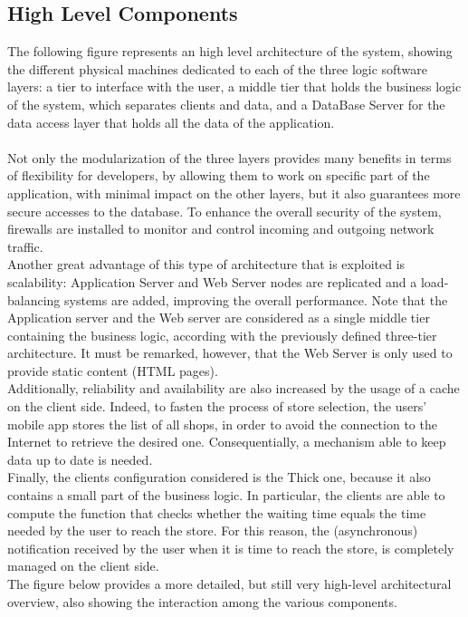 \documentclass{article}
\begin{document}
\subsection{High Level Components}
The following figure represents an high level architecture of the system, showing the different physical machines dedicated to each of the three logic software layers: a tier to interface with the user, a middle tier that holds the business logic of the system, which separates clients and data, and a DataBase Server for the data access layer that holds all the data of the application. \\
\smallskip\\
Not only the modularization of the three layers provides many benefits in terms of flexibility for developers, by allowing them to work on specific part of the application, with minimal impact on the other layers, but it also guarantees more secure accesses to the database. To enhance the overall security of the system, firewalls are installed to monitor and control incoming and outgoing network traffic.
\smallskip\\
Another great advantage of this type of architecture that is exploited is scalability: Application Server and Web Server nodes are replicated and a load-balancing systems are added, improving the overall performance. Note that the Application server and the Web server are considered as a single middle tier containing the business logic, according with the previously defined three-tier architecture. It must be remarked, however, that the Web Server is only used to provide static content (HTML pages).
\smallskip\\
Additionally, reliability and availability are also increased by the usage of a cache on the client side. Indeed, to fasten the process of store selection, the users’ mobile app stores the list of all shops, in order to avoid the connection to the Internet to retrieve the desired one. Consequentially, a mechanism able to keep data up to date is needed.
\smallskip\\
Finally, the clients configuration considered is the Thick one, because it also contains a small part of the business logic. In particular, the clients are able to compute the function that checks whether the waiting time equals the time needed by the user to reach the store. For this reason, the (asynchronous) notification received by the user when it is time to reach the store, is completely managed on the client side.
\smallskip\\
The figure below provides a more detailed, but still very high-level architectural overview, also showing the interaction among the various components.\\
\end{document}
